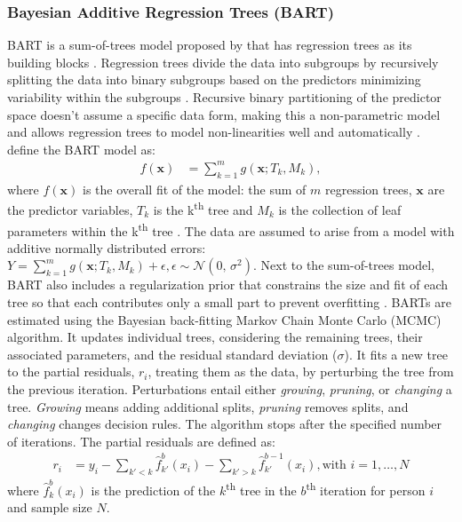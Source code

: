 \documentclass[10pt, a4paper, titlepage]{article}
\begin{document}
\subsubsection{Bayesian Additive Regression Trees (BART)}
BART is a sum-of-trees model proposed by \citet{chipman2010} that has regression trees as its building blocks \citep{chipman2010, hill2020, james2021}. Regression trees divide the data into subgroups by recursively splitting the data into binary subgroups based on the predictors minimizing variability within the subgroups \citep{hastie2017, james2021, salditt2023}. Recursive binary partitioning of the predictor space doesn't assume a specific data form, making this a non-parametric model \citep{hastie2017, james2021, salditt2023} and allows regression trees to model non-linearities well and automatically \citep{hill2020, burgette2010}. \citet{chipman2010} define the BART model as:
\begin{subequations}
\label{eq:BART}
\begin{align}
f(\textbf{x}) &= \sum^{m}_{k=1}g(\textbf{x}; T_{k}, M_{k}), \tag{1}
\end{align}
\end{subequations} where $f(\mathbf{x})$ is the overall fit of the model: the sum of $m$ regression trees, $\textbf{x}$ are the predictor variables, $T_{k}$ is the k\textsuperscript{th} tree and $M_{k}$ is the collection of leaf parameters within the k\textsuperscript{th} tree \citep{chipman2010, hill2020, james2021}. The data are assumed to arise from a model with additive normally distributed errors: $Y = \sum^{m}_{k=1}g(\textbf{x}; T_{k}, M_{k}) + \epsilon, \epsilon \sim \mathcal{N}(0,\,\sigma^{2})$.
Next to the sum-of-trees model, BART also includes a regularization prior that constrains the size and fit of each tree so that each contributes only a small part to prevent overfitting \citep{chipman2010, hill2020, james2021}. BARTs are estimated using the Bayesian back-fitting Markov Chain Monte Carlo (MCMC) algorithm. It updates individual trees, considering the remaining trees, their associated parameters, and the residual standard deviation ($\sigma$). It fits a new tree to the partial residuals, $r_{i}$, treating them as the data, by perturbing the tree from the previous iteration. Perturbations entail either \textit{growing}, \textit{pruning}, or \textit{changing} a tree. \textit{Growing} means adding additional splits, \textit{pruning} removes splits, and \textit{changing} changes decision rules. The algorithm stops after the specified number of iterations. The partial residuals are defined as:
\begin{subequations}
\label{eq:partialresiduals}
\begin{align}
r_i &= y_i - \sum_{k' < k} \hat{f}^{b}_{k'}(x_{i}) - \sum_{k' > k} \hat{f}^{b-1}_{k'}(x_{i}), \text{with } i = 1, \dots, N \tag{2}
\end{align}
\end{subequations} where $\hat{f}^{b}_{k}(x_{i})$ is the prediction of the $k$\textsuperscript{th} tree in the $b$\textsuperscript{th} iteration for person $i$ and sample size $N$.
\end{document}
